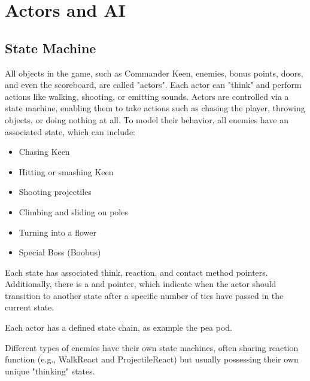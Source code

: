 \documentclass[book.tex]{subfiles}
\begin{document}
\section{Actors and AI}
\label{section:actors_and_ai}

\subsection{State Machine}
All objects in the game, such as Commander Keen, enemies, bonus points, doors, and even the scoreboard, are called "actors". Each actor can "think" and perform actions like walking, shooting, or emitting sounds. Actors are controlled via a state machine, enabling them to take actions such as chasing the player, throwing objects, or doing nothing at all. To model their behavior, all enemies have an associated state, which can include:
\begin{itemize}
  \item Chasing Keen
  \item Hitting or smashing Keen
  \item Shooting projectiles
  \item Climbing and sliding on poles
  \item Turning into a flower
  \item Special Boss (Boobus)
\end{itemize}

\par
Each state has associated think, reaction, and contact method pointers. Additionally, there is a  and  pointer, which indicate when the actor should transition to another state after a specific number of tics have passed in the current state.\\

\par
\begin{minipage}{\textwidth}
  
\end{minipage}
\label{state_type}
\par

Each actor has a defined state chain, as example the pea pod. \\
\par
\begin{minipage}{\textwidth}

\end{minipage}

\par
Different types of enemies have their own state machines, often sharing reaction function (e.g., WalkReact and ProjectileReact) but usually possessing their own unique "thinking" states.\\
\end{document}
